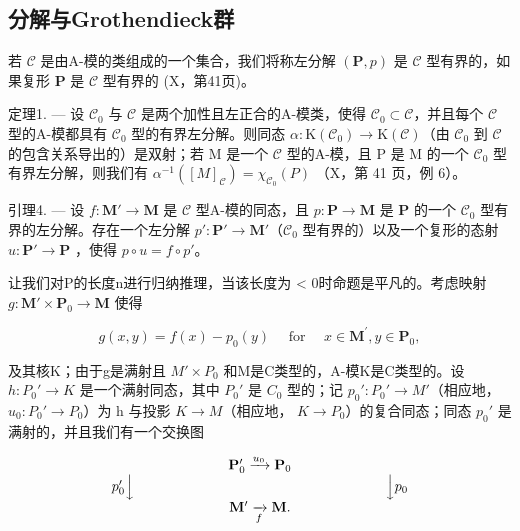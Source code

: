\subsection{分解与Grothendieck群}

若 \(\mathcal{C}\) 是由A-模的类组成的一个集合，我们将称左分解 \((\mathbf{P}, p)\) 是 \(\mathcal{C}\) 型有界的，如果复形 \(\mathbf{P}\) 是 \(\mathcal{C}\) 型有界的 (X，第41页)。

定理1. --- 设 \(\mathcal{C}_{0}\) 与 \(\mathcal{C}\) 是两个加性且左正合的A-模类，使得 \(\mathcal{C}_{0} \subset \mathcal{C}\)，并且每个 \(\mathcal{C}\) 型的A-模都具有 \(\mathcal{C}_{0}\) 型的有界左分解。则同态 \(\alpha : \mathrm{K}(\mathcal{C}_{0}) \to \mathrm{K}(\mathcal{C})\)（由 \(\mathcal{C}_{0}\) 到 \(\mathcal{C}\) 的包含关系导出的）是双射；若 M 是一个 \(\mathcal{C}\) 型的A-模，且 P 是 M 的一个 \(\mathcal{C}_{0}\) 型有界左分解，则我们有 \(\alpha^{-1}([M]_{\mathcal{C}}) = \chi_{\mathcal{C}_{0}}(P)\) （X，第 41 页，例 6）。

引理4. --- 设 \(f: \mathbf{M}' \to \mathbf{M}\) 是 \(\mathcal{C}\) 型A-模的同态，且 \(p: \mathbf{P} \to \mathbf{M}\) 是 \(\mathbf{P}\) 的一个 \(\mathcal{C}_0\) 型有界的左分解。存在一个左分解 \(p': \mathbf{P}' \to \mathbf{M}'\)（\(\mathcal{C}_0\) 型有界的）以及一个复形的态射 \(u: \mathbf{P}' \to \mathbf{P}\) ，使得 \(p \circ u = f \circ p'\)。

让我们对P的长度n进行归纳推理，当该长度为 \textless{} 0时命题是平凡的。考虑映射 \(g: \mathbf{M}' \times \mathbf{P}_0 \to \mathbf{M}\) 使得

\[
g (x, y) = f (x) - p _ {0} (y) \quad \text { for } \quad x \in \mathbf {M} ^ {\prime}, y \in \mathbf {P} _ {0},
\]

及其核K；由于g是满射且 \(M' \times P_{0}\) 和M是C类型的，A-模K是C类型的。设 \(h : P_{0}' \to K\) 是一个满射同态，其中 \(P_{0}'\) 是 \(C_{0}\) 型的；记 \(p_{0}' : P_{0}' \to M'\)（相应地， \(u_{0} : P_{0}' \to P_{0}\)）为 h 与投影 \(K \to M\)（相应地， \(K \to P_{0}\)）的复合同态；同态 \(p_{0}'\) 是满射的，并且我们有一个交换图

\[
\begin{array}{c} \mathbf {P} _ {0} ^ {\prime} \xrightarrow {u _ {0}} \mathbf {P} _ {0} \\ p _ {0} ^ {\prime} \Big \downarrow \qquad \qquad \qquad \qquad \qquad \qquad \qquad \qquad \qquad \Big \downarrow p _ {0} \\ \mathbf {M} ^ {\prime} \xrightarrow [ f ]{} \mathbf {M}. \end{array}
\]

